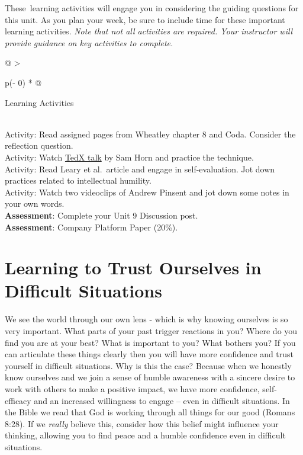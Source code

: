 \documentclass[
]{book}
\begin{document}
These~learning activities will engage you in considering the guiding questions for this unit. As you plan your week, be sure to include time for these important learning activities. \emph{Note that not all activities are required. Your instructor will provide guidance on key activities to complete.}

\begin{longtable}[]{@{}
  >{\raggedright\arraybackslash}p{(\columnwidth - 0\tabcolsep) * }@{}}
\toprule
\begin{minipage}[b]{\linewidth}\raggedright
Learning Activities
\end{minipage} \\
\midrule
\endhead
Activity: Read assigned pages from Wheatley chapter 8 and Coda. Consider the reflection question. \\
Activity: Watch \href{https://youtu.be/Xlg8zdSVjgg}{TedX talk} by Sam Horn and practice the technique. \\
Activity: Read Leary et al.~article and engage in self-evaluation. Jot down practices related to intellectual humility. \\
Activity: Watch two videoclips of Andrew Pinsent and jot down some notes in your own words. \\
\textbf{Assessment}: Complete your Unit 9 Discussion post. \\
\textbf{Assessment}: Company Platform Paper (20\%). \\
\bottomrule
\end{longtable}

\hypertarget{learning-to-trust-ourselves-in-difficult-situations}{%
\section{Learning to Trust Ourselves in Difficult Situations}\label{learning-to-trust-ourselves-in-difficult-situations}}

We see the world through our own lens - which is why knowing ourselves is so very important. What parts of your past trigger reactions in you? Where do you find you are at your best? What is important to you? What bothers you? If you can articulate these things clearly then you will have more confidence and trust yourself in difficult situations. Why is this the case? Because when we honestly know ourselves and we join a sense of humble awareness with a sincere desire to work with others to make a positive impact, we have more confidence, self-efficacy and an increased willingness to engage -- even in difficult situations. In the Bible we read that God is working through all things for our good (Romans 8:28). If we \emph{really} believe this, consider how this belief might influence your thinking, allowing you to find peace and a humble confidence even in difficult situations.
\end{document}
